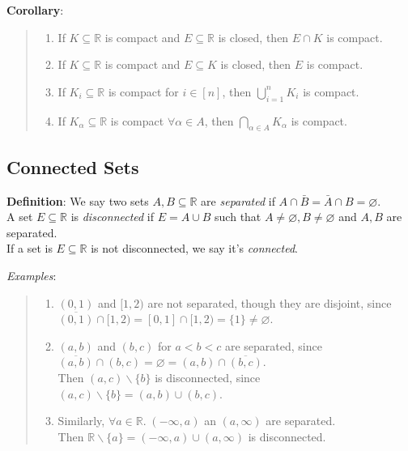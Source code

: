 \documentclass[11pt]{article}
\begin{document}
\textbf{Corollary}:
\begin{quote}\vspace{-0.3cm}
	\begin{enumerate}
	\item If $K \subseteq \mathbb{R}$ is compact and $E \subseteq \mathbb{R}$ is closed, then $E \cap K$ is compact.
	\item If $K \subseteq \mathbb{R}$ is compact and $E \subseteq K$ is closed, then $E$ is compact.
	\item If $K_i \subseteq \mathbb{R}$ is compact for $i \in [n]$, then $\bigcup_{i=1}^n K_i$ is compact.
	\item If $K_\alpha \subseteq \mathbb{R}$ is compact $\forall \alpha \in A$, then $\bigcap_{\alpha \in A} K_\alpha$ is compact.
	\end{enumerate}
\end{quote}

\subsection{Connected Sets}

\textbf{Definition}: We say two sets $A, B \subseteq \mathbb{R}$ are \emph{separated} if $A \cap \bar{B} = \bar{A} \cap B = \varnothing$.\\
A set $E \subseteq \mathbb{R}$ is \emph{disconnected} if $E = A \cup B$ such that $A \neq \varnothing, B \neq \varnothing$ and $A, B$ are separated.\\
If a set is $E \subseteq \mathbb{R}$ is not disconnected, we say it's \emph{connected}.

\emph{Examples}:
\begin{quote}\vspace{-0.3cm}
	\begin{enumerate}
	\item $(0, 1)$ and $[1,2)$ are not separated, though they are disjoint, since $\overline{(0,1)} \cap [1,2) = [0,1] \cap [1,2) = \{1\} \neq \varnothing$.
	\item $(a,b)$ and $(b,c)$ for $a < b < c$ are separated, since $\overline{(a,b)} \cap (b,c) = \varnothing = (a,b) \cap \overline{(b,c)}$.\\
	Then $(a,c) \backslash \{b\}$ is disconnected, since $(a,c) \backslash \{b\} = (a,b) \cup (b,c)$.
	\item Similarly, $\forall a \in \mathbb{R}.\; (-\infty, a)$ an $(a, \infty)$ are separated.\\
	Then $\mathbb{R} \backslash \{a\} = (-\infty, a) \cup (a, \infty)$ is disconnected.
	\end{enumerate}
\end{quote}
\end{document}
